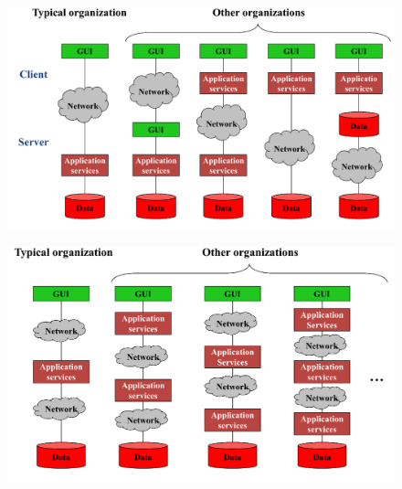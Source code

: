 \documentclass[10pt,a4paper]{article}
\begin{document}
\begin{figure}[h!]
\centering
\begin{minipage}{.5\textwidth}
  \centering
  \includegraphics[width=.8\linewidth]{images/two-tiered.png}
  \label{fig:two-tiered}
\end{minipage}%
\begin{minipage}{.5\textwidth}
  \centering
  \includegraphics[width=.8\linewidth]{images/three-tiered.png}
  \label{fig:three-tier}
\end{minipage}
\end{figure} 
\pagebreak
\end{document}
